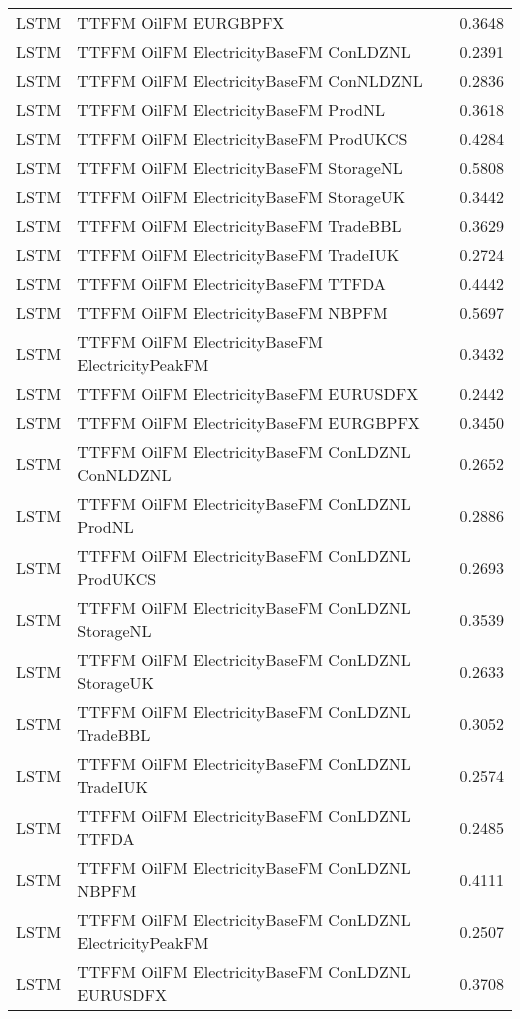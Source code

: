 \begin{table}[h!]
\begin{adjustbox}{max width=\textwidth}
\begin{tabular}{llr}
  LSTM & TTFFM OilFM EURGBPFX & 0.3648 \\ 
  LSTM & TTFFM OilFM ElectricityBaseFM ConLDZNL & 0.2391 \\ 
  LSTM & TTFFM OilFM ElectricityBaseFM ConNLDZNL & 0.2836 \\ 
  LSTM & TTFFM OilFM ElectricityBaseFM ProdNL & 0.3618 \\ 
  LSTM & TTFFM OilFM ElectricityBaseFM ProdUKCS & 0.4284 \\ 
  LSTM & TTFFM OilFM ElectricityBaseFM StorageNL & 0.5808 \\ 
  LSTM & TTFFM OilFM ElectricityBaseFM StorageUK & 0.3442 \\ 
  LSTM & TTFFM OilFM ElectricityBaseFM TradeBBL & 0.3629 \\ 
  LSTM & TTFFM OilFM ElectricityBaseFM TradeIUK & 0.2724 \\ 
  LSTM & TTFFM OilFM ElectricityBaseFM TTFDA & 0.4442 \\ 
  LSTM & TTFFM OilFM ElectricityBaseFM NBPFM & 0.5697 \\ 
  LSTM & TTFFM OilFM ElectricityBaseFM ElectricityPeakFM & 0.3432 \\ 
  LSTM & TTFFM OilFM ElectricityBaseFM EURUSDFX & 0.2442 \\ 
  LSTM & TTFFM OilFM ElectricityBaseFM EURGBPFX & 0.3450 \\ 
  LSTM & TTFFM OilFM ElectricityBaseFM ConLDZNL ConNLDZNL & 0.2652 \\ 
  LSTM & TTFFM OilFM ElectricityBaseFM ConLDZNL ProdNL & 0.2886 \\ 
  LSTM & TTFFM OilFM ElectricityBaseFM ConLDZNL ProdUKCS & 0.2693 \\ 
  LSTM & TTFFM OilFM ElectricityBaseFM ConLDZNL StorageNL & 0.3539 \\ 
  LSTM & TTFFM OilFM ElectricityBaseFM ConLDZNL StorageUK & 0.2633 \\ 
  LSTM & TTFFM OilFM ElectricityBaseFM ConLDZNL TradeBBL & 0.3052 \\ 
  LSTM & TTFFM OilFM ElectricityBaseFM ConLDZNL TradeIUK & 0.2574 \\ 
  LSTM & TTFFM OilFM ElectricityBaseFM ConLDZNL TTFDA & 0.2485 \\ 
  LSTM & TTFFM OilFM ElectricityBaseFM ConLDZNL NBPFM & 0.4111 \\ 
  LSTM & TTFFM OilFM ElectricityBaseFM ConLDZNL ElectricityPeakFM & 0.2507 \\ 
  LSTM & TTFFM OilFM ElectricityBaseFM ConLDZNL EURUSDFX & 0.3708 \\ 

\end{tabular}
\end{adjustbox}
\end{table}
